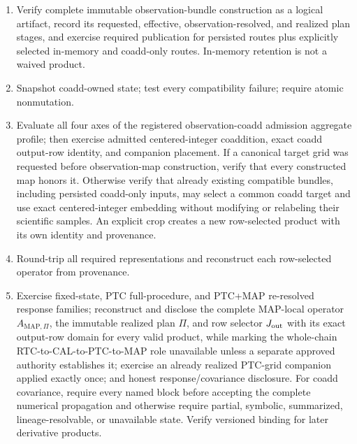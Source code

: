 \documentclass[10pt]{article}
\begin{document}
\begin{enumerate}
several descendants at different pixels; original and descendants in
different pixels; missing original coordinate; boundary loss; multiple maps
sharing one original; distinct observations with numerically identical
original coordinates; and donor/synthesized descendants. Verify exact
observation/UID/native/stable-ALIGN-slot/generation keys, layered AST
ALIGN-grid parent in the target WCS, one own-coordinate placement, separate
influence edges, and no precision or temporal-support promotion.
\item Verify complete immutable observation-bundle construction as a logical
artifact, record its requested, effective, observation-resolved, and realized
plan stages, and exercise
required publication for persisted routes plus explicitly selected in-memory
and coadd-only routes.  In-memory retention is not a waived product.
\item Snapshot coadd-owned state; test every compatibility failure; require
atomic nonmutation.
\item Evaluate all four axes of the registered observation-coadd admission
aggregate profile; then exercise admitted
centered-integer coaddition, exact coadd output-row identity, and companion
placement.  If a canonical target grid was requested before observation-map
construction, verify that every constructed map honors it.  Otherwise verify
that already existing compatible bundles, including persisted coadd-only
inputs, may select a common coadd target and use exact centered-integer
embedding without modifying or relabeling their scientific samples.  An
explicit crop creates a new row-selected product with its own identity and
provenance.
\item Round-trip all required representations and reconstruct each
row-selected operator from provenance.
\item Exercise fixed-state, PTC full-procedure, and PTC+MAP re-resolved
response families; reconstruct and disclose the complete MAP-local operator
\(A_{{\mathrm{MAP}},\Pi}\), the immutable realized plan \(\Pi\), and row
selector \(J_{\rm out}\) with its exact output-row domain for every valid
product, while
marking the whole-chain RTC-to-CAL-to-PTC-to-MAP role unavailable unless a
separate approved authority establishes it; exercise an already realized
PTC-grid companion applied exactly once; and honest response/covariance
disclosure. For coadd covariance, require
every named block before accepting the complete numerical propagation and
otherwise require partial, symbolic, summarized, lineage-resolvable, or
unavailable state. Verify versioned binding for later derivative products.

\end{enumerate}
\end{document}
